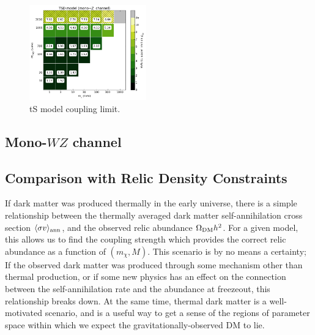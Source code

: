 \begin{figure}[!h]
\begin{center}
\includegraphics[width=0.45\textwidth]{figures/grid_allpoints_TSD_rat1.png}
\caption{tS model coupling limit.}
\label{fig:MonoZ_TSD_couplinglimit}
\end{center}
\end{figure}

\subsection{Mono-$WZ$ channel}

\subsection{Comparison with Relic Density Constraints}


If dark matter was produced thermally in the early universe, there is a simple relationship between the thermally averaged dark matter self-annihilation cross section $\langle\sigma v\rangle_{\rm ann}$, and the observed relic abundance $\Omega_{\rm DM}h^2$. For a given model, this allows us to find the coupling strength which provides the correct relic abundance as a function of $(m_\chi, M)$.
%
This scenario is by no means a certainty; If the observed dark matter was produced through some mechanism other than thermal production, or if some new physics has an effect on the connection between the self-annihilation rate and the abundance at freezeout, this relationship breaks down. At the same time, thermal dark matter is a well-motivated scenario, and is a useful way to get a sense of the regions of parameter space within which we expect the gravitationally-observed DM to lie.

